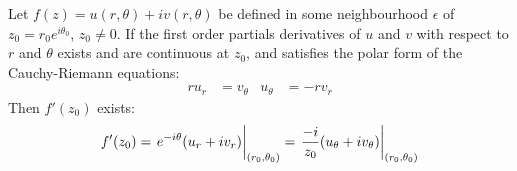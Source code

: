 \documentclass[12pt, english]{book}
\begin{document}
	\begin{theorem}
		\label{Cauchy-Riemann Equations (Polar) Theorem - Complex}
		Let \(f(z) = u(r, \theta) + iv(r,\theta)\) be defined in some neighbourhood \(\epsilon\) of \(z_0 = r_0 e^{i\theta_0}\), $z_0 \neq 0$. If the first order partials derivatives of \(u\) and \(v\) with respect to \(r\) and \(\theta\) exists and are continuous at \(z_0\), and satisfies the polar form of the Cauchy-Riemann equations: 
		\begin{align*}
			ru_r &= v_\theta	&	u_\theta &= -r v_r
		\end{align*}
		Then \(f'(z_0)\) exists:
		\begin{align*}
			f'(z_0) = \eval{e^{-i\theta}(u_r + iv_r)}_{(r_0, \theta_0)}
					= \eval{\frac{-i}{z_0}(u_\theta + iv_\theta )}_{(r_0, \theta_0)}
		\end{align*}
	\end{theorem}
\end{document}
